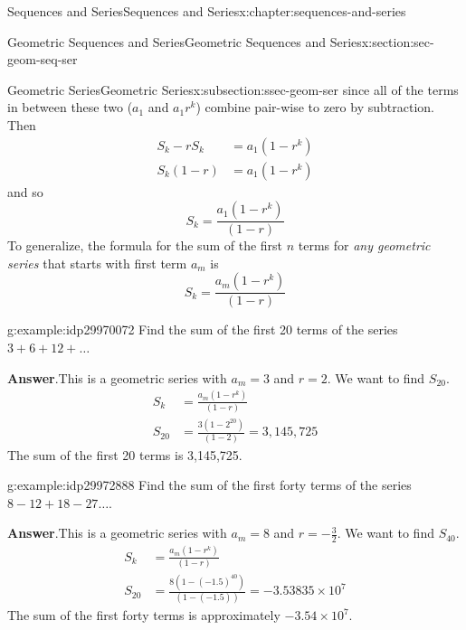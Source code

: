 \documentclass[twoside,10pt,]{book}
\newcommand{\blocktitlefont}{\relax}
\numberwithin{equation}{section}
\newcommand{\amp}{&}
\begin{document}
\begin{chapterptx}{Sequences and Series}{}{Sequences and Series}{}{}{x:chapter:sequences-and-series}
\begin{sectionptx}{Geometric Sequences and Series}{}{Geometric Sequences and Series}{}{}{x:section:sec-geom-seq-ser}
\begin{subsectionptx}{Geometric Series}{}{Geometric Series}{}{}{x:subsection:ssec-geom-ser}
since all of the terms in between these two (\(a_1\) and \(a_1r^k\)) combine pair-wise to zero by subtraction.  Then%
\begin{align*}
{S_k} - r{S_k}\amp = {a_1}\left( {1 - {r^k}} \right)\\
{S_k}\left( {1 - r} \right) \amp = {a_1}\left( {1 - {r^k}} \right)
\end{align*}
and so%
\begin{equation*}
{S_k} = \frac{{{a_1}\left( {1 - {r^k}} \right)}}{{\left( {1 - r} \right)}}
\end{equation*}
To generalize, the formula for the sum of the first \(n\) terms for \emph{any geometric series}  that starts with first term \(a_m\) is%
\begin{equation*}
{S_k} = \frac{{{a_m}\left( {1 - {r^k}} \right)}}{{\left( {1 - r} \right)}}
\end{equation*}
\begin{example}{}{g:example:idp29970072}%
Find the sum of the first 20 terms of the series \(3 + 6 + 12 + \ldots\)\par\smallskip%
\noindent\textbf{\blocktitlefont Answer}.\label{g:answer:idp29965080}{}\hypertarget{g:answer:idp29965080}{}\quad{}This is a geometric series with \(a_m = 3\) and \(r = 2\).  We want to find \(S_{20}\).%
\begin{align*}
{S_k} \amp = \frac{{{a_m}\left( {1 - {r^k}} \right)}}{{\left( {1 - r} \right)}}\\
{S_{20}} \amp = \frac{{3\left( {1 - {2^{20}}} \right)}}{{\left( {1 - 2} \right)}} = 3,145,725
\end{align*}
The sum of the first 20 terms is 3,145,725.\end{example}
 \begin{example}{}{g:example:idp29972888}%
Find the sum of the first forty terms of the series \(8 - 12 + 18 - 27 \ldots\).\par\smallskip%
\noindent\textbf{\blocktitlefont Answer}.\label{g:answer:idp29974680}{}\hypertarget{g:answer:idp29974680}{}\quad{}This is a geometric series with \(a_m = 8\) and \(r = -\frac{3}{2}\).  We want to find \(S_{40}\).%
\begin{align*}
{S_k} \amp = \frac{{{a_m}\left( {1 - {r^k}} \right)}}{{\left( {1 - r} \right)}}\\
{S_{20}} \amp = \frac{{8\left( {1 - {{\left( { - 1.5} \right)}^{40}}} \right)}}{{\left( {1 - \left( { - 1.5} \right)} \right)}} =  - 3.53835 \times {10^7}
\end{align*}
The sum of the first forty terms is approximately \(-3.54 \times{} 10^7\).\end{example}

\end{subsectionptx}
\end{sectionptx}
\end{chapterptx}
\end{document}

